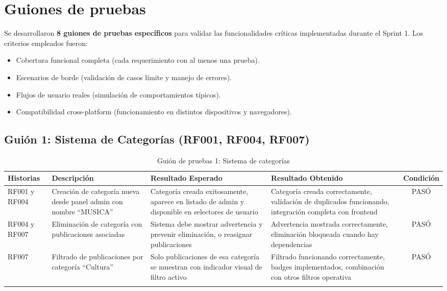 \section{Guiones de pruebas}

Se desarrollaron \textbf{8 guiones de pruebas específicos} para validar las funcionalidades críticas implementadas durante el Sprint 1.  
Los criterios empleados fueron:
\begin{itemize}
    \item Cobertura funcional completa (cada requerimiento con al menos una prueba).
    \item Escenarios de borde (validación de casos límite y manejo de errores).
    \item Flujos de usuario reales (simulación de comportamientos típicos).
    \item Compatibilidad cross-platform (funcionamiento en distintos dispositivos y navegadores).
\end{itemize}

\subsection{Guión 1: Sistema de Categorías (RF001, RF004, RF007)}

\begin{longtable}{ | p{2cm} | p{4cm} | p{4cm} | p{4cm} | c |}
\hline
\textbf{Historias} & \textbf{Descripción} & \textbf{Resultado Esperado} & \textbf{Resultado Obtenido} & \textbf{Condición}\\
\hline
RF001 y RF004 & Creación de categoría nueva desde panel admin con nombre ``MUSICA'' & Categoría creada exitosamente, aparece en listado de admin y disponible en selectores de usuario & Categoría creada correctamente, validación de duplicados funcionando, integración completa con frontend & \color{ForestGreen}PASÓ \\
\hline
RF004 y RF007 & Eliminación de categoría con publicaciones asociadas & Sistema debe mostrar advertencia y prevenir eliminación, o reasignar publicaciones & Advertencia mostrada correctamente, eliminación bloqueada cuando hay dependencias & \color{ForestGreen}PASÓ \\
\hline
RF007 & Filtrado de publicaciones por categoría ``Cultura'' & Solo publicaciones de esa categoría se muestran con indicador visual de filtro activo & Filtrado funcionando correctamente, badges implementados, combinación con otros filtros operativa & \color{ForestGreen}PASÓ \\
\hline
\caption{Guión de pruebas 1: Sistema de categorías}
\label{TestScript1}
\end{longtable}

